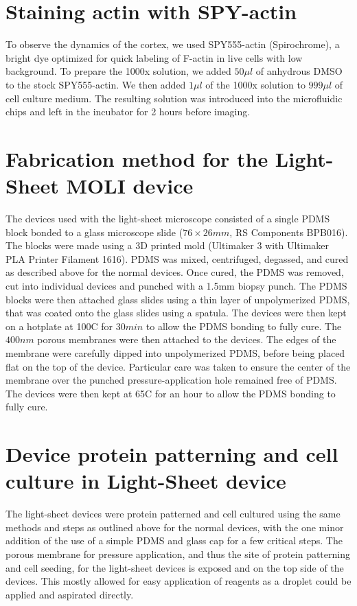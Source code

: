 \section{Staining actin with SPY-actin}

To observe the dynamics of the cortex, we used SPY555-actin (Spirochrome), a bright dye optimized for quick labeling of F-actin in live cells with low background. To prepare the 1000x solution, we added  $50\mu l$ of anhydrous DMSO to the stock SPY555-actin. We then added $1 \mu l$ of the 1000x solution to $999\mu l$ of cell culture medium. The resulting solution was introduced into the microfluidic chips and left in the incubator for 2 hours before imaging.

\section{Fabrication method for the Light-Sheet MOLI device }

The devices used with the light-sheet microscope consisted of a single PDMS block bonded to a glass microscope slide ($76 \times 26 mm$, RS Components BPB016). The blocks were made using a 3D printed mold (Ultimaker 3 with Ultimaker PLA Printer Filament 1616). PDMS was mixed, centrifuged, degassed, and cured as described above for the normal devices. Once cured, the PDMS was removed, cut into individual devices and punched with a 1.5mm biopsy punch. The PDMS blocks were then attached glass slides using a thin layer of unpolymerized PDMS, that was coated onto the glass slides using a spatula. The devices were then kept on a hotplate at 100\textdegree{}C for $30min$ to allow the PDMS bonding to fully cure. The $400nm$ porous membranes were then attached to the devices. The edges of the membrane were carefully dipped into unpolymerized PDMS, before being placed flat on the top of the device. Particular care was taken to ensure the center of the membrane over the punched pressure-application hole remained free of PDMS. The devices were then kept at  65\textdegree{}C for an hour to allow the PDMS bonding to fully cure.

\section{Device protein patterning and cell culture in Light-Sheet device}

The light-sheet devices were protein patterned and cell cultured using the same methods and steps as outlined above for the normal devices, with the one minor addition of the use of a simple PDMS and glass cap for a few critical steps. The porous membrane for pressure application, and thus the site of protein patterning and cell seeding, for the light-sheet devices is exposed and on the top side of the devices. This mostly allowed for easy application of reagents as a droplet could be applied and aspirated directly. 

